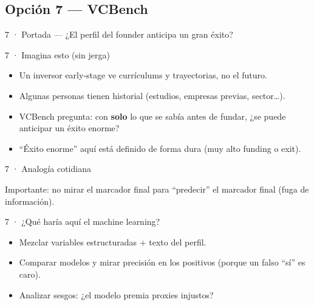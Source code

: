 \subsection{Opción 7 --- VCBench}

\begin{frame}{7 · Portada --- ¿El perfil del founder anticipa un gran éxito?}
\end{frame}

\begin{frame}{7 · Imagina esto (sin jerga)}
  \begin{itemize}
    \item Un inversor early-stage ve currículums y trayectorias, no el futuro.
    \item Algunas personas tienen historial (estudios, empresas previas, sector\ldots).
    \item VCBench pregunta: con \textbf{solo} lo que se sabía antes de fundar, ¿se puede anticipar un éxito enorme?
    \item ``Éxito enorme'' aquí está definido de forma dura (muy alto funding o exit).
  \end{itemize}
\end{frame}

\begin{frame}{7 · Analogía cotidiana}
  \begin{center}
  \end{center}
  \vspace{0.35em}
  Importante: no mirar el marcador final para ``predecir'' el marcador final (fuga de información).
\end{frame}

\begin{frame}{7 · ¿Qué haría aquí el machine learning?}
  \begin{itemize}
    \item Mezclar variables estructuradas + texto del perfil.
    \item Comparar modelos y mirar precisión en los positivos (porque un falso ``sí'' es caro).
    \item Analizar sesgos: ¿el modelo premia proxies injustos?
  \end{itemize}
\end{frame}

